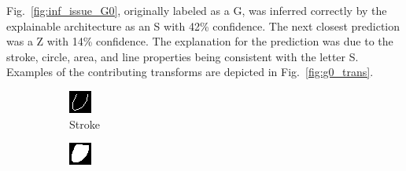 \documentclass[conference]{IEEEtran}
\begin{document}
Fig.~\ref{fig:inf_issue_G0}, originally labeled as a G, was inferred correctly by
the explainable architecture as an S with 42\% confidence.  The next closest
prediction was a Z with 14\% confidence.  The explanation for the prediction was
due to the stroke, circle, area, and line properties being consistent with the
letter S. Examples of the contributing transforms are depicted in
Fig.~\ref{fig:g0_trans}.

\begin{figure}[h]
    \centering
    \begin{subfigure}{.20\columnwidth}
        \centering
        \includegraphics[width=.90\textwidth]{./images/issues/excluded-T-5-stroke.png}
        \caption{Stroke}
    \end{subfigure}%
    \begin{subfigure}{.20\columnwidth}
        \centering
        \includegraphics[width=.90\textwidth]{./images/issues/excluded-T-5-area.png}

\end{subfigure}
\end{figure}
\end{document}

